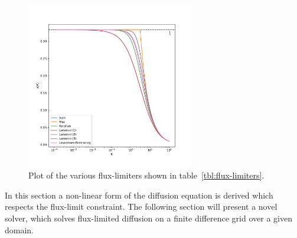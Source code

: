 \begin{figure}[h]
\centering
\includegraphics[width=0.65\textwidth]{06_fld/figures/plot_flux_limiters.pdf}
\caption{Plot of the various flux-limiters shown in table~\ref{tbl:flux-limiters}.}
\label{fig:flux-limiters}
\end{figure}
%

In this section a non-linear form of the diffusion equation is derived which respects the flux-limit constraint. The following section will present a novel solver, which solves flux-limited diffusion on a finite difference grid over a given domain.